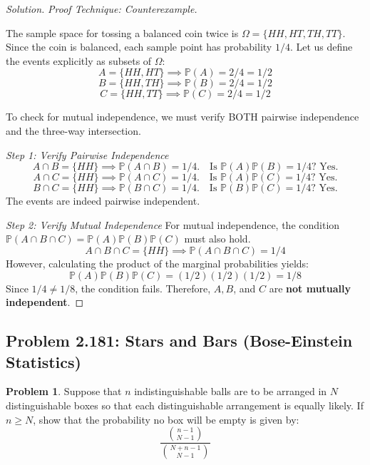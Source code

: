 \documentclass[11pt]{article}
\theoremstyle{definition}
\newtheorem{problem}{Problem}[section]
\theoremstyle{remark}
\newcommand{\Prob}{\mathbb{P}}
\begin{document}
\begin{proof}[Solution]
\textit{Proof Technique: Counterexample.}

The sample space for tossing a balanced coin twice is $\Omega = \{HH, HT, TH, TT\}$. Since the coin is balanced, each sample point has probability $1/4$.
Let us define the events explicitly as subsets of $\Omega$:
\[ A = \{HH, HT\} \implies \Prob(A) = 2/4 = 1/2 \]
\[ B = \{HH, TH\} \implies \Prob(B) = 2/4 = 1/2 \]
\[ C = \{HH, TT\} \implies \Prob(C) = 2/4 = 1/2 \]

To check for mutual independence, we must verify BOTH pairwise independence and the three-way intersection.

\textit{Step 1: Verify Pairwise Independence}
\[ A \cap B = \{HH\} \implies \Prob(A \cap B) = 1/4. \quad \text{Is } \Prob(A)\Prob(B) = 1/4? \text{ Yes.} \]
\[ A \cap C = \{HH\} \implies \Prob(A \cap C) = 1/4. \quad \text{Is } \Prob(A)\Prob(C) = 1/4? \text{ Yes.} \]
\[ B \cap C = \{HH\} \implies \Prob(B \cap C) = 1/4. \quad \text{Is } \Prob(B)\Prob(C) = 1/4? \text{ Yes.} \]
The events are indeed pairwise independent.

\textit{Step 2: Verify Mutual Independence}
For mutual independence, the condition $\Prob(A \cap B \cap C) = \Prob(A)\Prob(B)\Prob(C)$ must also hold.
\[ A \cap B \cap C = \{HH\} \implies \Prob(A \cap B \cap C) = 1/4 \]
However, calculating the product of the marginal probabilities yields:
\[ \Prob(A)\Prob(B)\Prob(C) = (1/2)(1/2)(1/2) = 1/8 \]
Since $1/4 \neq 1/8$, the condition fails. Therefore, $A, B$, and $C$ are \textbf{not mutually independent}.
\end{proof}

\subsection{Problem 2.181: Stars and Bars (Bose-Einstein Statistics)}
\begin{problem}
Suppose that $n$ indistinguishable balls are to be arranged in $N$ distinguishable boxes so that each distinguishable arrangement is equally likely. If $n \ge N$, show that the probability no box will be empty is given by:
\[ \frac{ \binom{n-1}{N-1} }{ \binom{N+n-1}{N-1} } \]
\end{problem}
\end{document}
